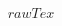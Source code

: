 \documentclass[{{fontSize}}pt]{standalone}
\begin{document}
   \begin{varwidth}{50in}
        \begin{equation*}
            {{rawTex}}
        \end{equation*}
    \end{varwidth}
\end{document}
